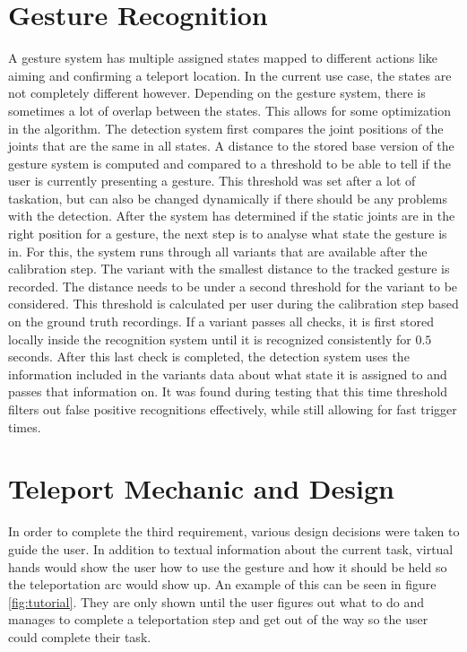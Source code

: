 \section{Gesture Recognition}
A gesture system has multiple assigned states mapped to different actions like aiming and confirming a teleport location. In the current use case, the states are not completely different however. Depending on the gesture system, there is sometimes a lot of overlap between the states. This allows for some optimization in the algorithm. The detection system first compares the joint positions of the joints that are the same in all states. A distance to the stored base version of the gesture system is computed and compared to a threshold to be able to tell if the user is currently presenting a gesture. This threshold was set after a lot of taskation, but can also be changed dynamically if there should be any problems with the detection. After the system has determined if the static joints are in the right position for a gesture, the next step is to analyse what state the gesture is in. For this, the system runs through all variants that are available after the calibration step. The variant with the smallest distance to the tracked gesture is recorded. The distance needs to be under a second threshold for the variant to be considered. This threshold is calculated per user during the calibration step based on the ground truth recordings. If a variant passes all checks, it is first stored locally inside the recognition system until it is recognized consistently for $0.5$ seconds. After this last check is completed, the detection system uses the information included in the variants data about what state it is assigned to and passes that information on. It was found during testing that this time threshold filters out false positive recognitions effectively, while still allowing for fast trigger times.


\section{Teleport Mechanic and Design}
In order to complete the third requirement, various design decisions were taken to guide the user. In addition to textual information about the current task, virtual hands would show the user how to use the gesture and how it should be held so the teleportation arc would show up. An example of this can be seen in figure \ref{fig:tutorial}. They are only shown until the user figures out what to do and manages to complete a teleportation step and get out of the way so the user could complete their task.

